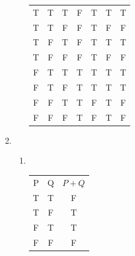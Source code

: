 \documentclass[12pt]{exam}
\begin{document}
\begin{enumerate}
\begin{enumerate}
\begin{table}[h]
\begin{tabular}{ccccccc}
                        T       & T       & T       & F       & T       & T       & T       \\
                        T       & T       & F       & F       & T       & F       & F       \\ 
                        T       & F       & T       & F       & T       & T       & T       \\
                        T       & F       & F       & F       & T       & F       & F       \\
                        F       & T       & T       & T       & T       & T       & T       \\
                        F       & T       & F       & T       & T       & T       & T       \\
                        F       & F       & T       & T       & F       & T       & F       \\
                        F       & F       & F       & T       & F       & T       & F       \\
                        
                        
                    \end{tabular}
                \end{table}
        
        \end{enumerate}

    \item ~\\
        
        \begin{enumerate}

            \item ~\\

                \begin{table}[h]
                    \centering 
                    \label{tab:example_table}
                    
                    \begin{tabular}{ccc}
                        
                        P & Q & \textbf{$ P + Q $} \\
                        
                        T       & T       & F       \\
                        T       & F       & T       \\
                        F       & T       & T       \\
                        F       & F       & F       \\
                        

\end{tabular}
\end{table}
\end{enumerate}
\end{enumerate}
\end{document}
